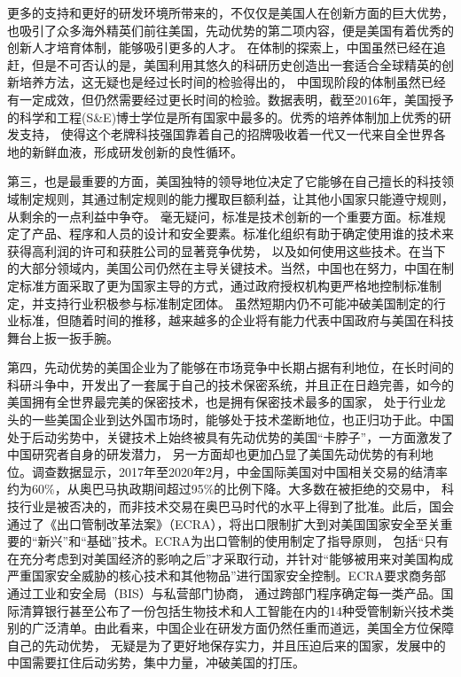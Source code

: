 \documentclass[UTF8]{article}
\begin{document}
    更多的支持和更好的研发环境所带来的，不仅仅是美国人在创新方面的巨大优势，也吸引了众多海外精英们前往美国，先动优势的第二项内容，便是美国有着优秀的创新人才培育体制，能够吸引更多的人才。
    在体制的探索上，中国虽然已经在追赶，但是不可否认的是，美国利用其悠久的科研历史创造出一套适合全球精英的创新培养方法，这无疑也是经过长时间的检验得出的，
    中国现阶段的体制虽然已经有一定成效，但仍然需要经过更长时间的检验。数据表明，截至2016年，美国授予的科学和工程(S\&E)博士学位是所有国家中最多的。优秀的培养体制加上优秀的研发支持，
    使得这个老牌科技强国靠着自己的招牌吸收着一代又一代来自全世界各地的新鲜血液，形成研发创新的良性循环。

    第三，也是最重要的方面，美国独特的领导地位决定了它能够在自己擅长的科技领域制定规则，其通过制定规则的能力攫取巨额利益，让其他小国家只能遵守规则，从剩余的一点利益中争夺。
    毫无疑问，标准是技术创新的一个重要方面。标准规定了产品、程序和人员的设计和安全要素。标准化组织有助于确定使用谁的技术来获得高利润的许可和获胜公司的显著竞争优势，
    以及如何使用这些技术。在当下的大部分领域内，美国公司仍然在主导关键技术。当然，中国也在努力，中国在制定标准方面采取了更为国家主导的方式，通过政府授权机构更严格地控制标准制定，并支持行业积极参与标准制定团体。
    虽然短期内仍不可能冲破美国制定的行业标准，但随着时间的推移，越来越多的企业将有能力代表中国政府与美国在科技舞台上扳一扳手腕。

    第四，先动优势的美国企业为了能够在市场竞争中长期占据有利地位，在长时间的科研斗争中，开发出了一套属于自己的技术保密系统，并且正在日趋完善，如今的美国拥有全世界最完美的保密技术，也是拥有保密技术最多的国家，
    处于行业龙头的一些美国企业到达外国市场时，能够处于技术垄断地位，也正归功于此。中国处于后动劣势中，关键技术上始终被具有先动优势的美国“卡脖子”，一方面激发了中国研究者自身的研发潜力，
    另一方面却也更加凸显了美国先动优势的有利地位。调查数据显示，2017年至2020年2月，中金国际美国对中国相关交易的结清率约为60\%，从奥巴马执政期间超过95\%的比例下降。大多数在被拒绝的交易中，
    科技行业是被否决的，而非技术交易在奥巴马时代的水平上得到了批准。此后，国会通过了《出口管制改革法案》（ECRA），将出口限制扩大到对美国国家安全至关重要的“新兴”和“基础”技术。ECRA为出口管制的使用制定了指导原则，
    包括“只有在充分考虑到对美国经济的影响之后”才采取行动，并针对“能够被用来对美国构成严重国家安全威胁的核心技术和其他物品”进行国家安全控制。ECRA要求商务部通过工业和安全局（BIS）与私营部门协商，
    通过跨部门程序确定每一类产品。国际清算银行甚至公布了一份包括生物技术和人工智能在内的14种受管制新兴技术类别的广泛清单。由此看来，中国企业在研发方面仍然任重而道远，美国全方位保障自己的先动优势，
    无疑是为了更好地保存实力，并且压迫后来的国家，发展中的中国需要扛住后动劣势，集中力量，冲破美国的打压。
\end{document}
